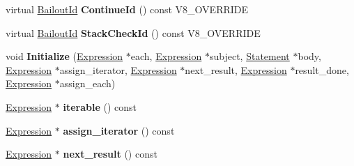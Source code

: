 \begin{DoxyCompactItemize}
\item 
\hypertarget{classv8_1_1internal_1_1_v8___f_i_n_a_l_a90b5e273e8b8f7894751af55a67b2be4}{}virtual \hyperlink{classv8_1_1internal_1_1_bailout_id}{Bailout\+Id} {\bfseries Continue\+Id} () const V8\+\_\+\+O\+V\+E\+R\+R\+I\+D\+E\label{classv8_1_1internal_1_1_v8___f_i_n_a_l_a90b5e273e8b8f7894751af55a67b2be4}

\item 
\hypertarget{classv8_1_1internal_1_1_v8___f_i_n_a_l_a990170f24ee26a29557d05605ccb92d8}{}virtual \hyperlink{classv8_1_1internal_1_1_bailout_id}{Bailout\+Id} {\bfseries Stack\+Check\+Id} () const V8\+\_\+\+O\+V\+E\+R\+R\+I\+D\+E\label{classv8_1_1internal_1_1_v8___f_i_n_a_l_a990170f24ee26a29557d05605ccb92d8}

\item 
\hypertarget{classv8_1_1internal_1_1_v8___f_i_n_a_l_a0c275e326484e10eecd260aaa7774269}{}void {\bfseries Initialize} (\hyperlink{classv8_1_1internal_1_1_expression}{Expression} $\ast$each, \hyperlink{classv8_1_1internal_1_1_expression}{Expression} $\ast$subject, \hyperlink{classv8_1_1internal_1_1_statement}{Statement} $\ast$body, \hyperlink{classv8_1_1internal_1_1_expression}{Expression} $\ast$assign\+\_\+iterator, \hyperlink{classv8_1_1internal_1_1_expression}{Expression} $\ast$next\+\_\+result, \hyperlink{classv8_1_1internal_1_1_expression}{Expression} $\ast$result\+\_\+done, \hyperlink{classv8_1_1internal_1_1_expression}{Expression} $\ast$assign\+\_\+each)\label{classv8_1_1internal_1_1_v8___f_i_n_a_l_a0c275e326484e10eecd260aaa7774269}

\item 
\hypertarget{classv8_1_1internal_1_1_v8___f_i_n_a_l_a776f5cde60063e5fbc197649b8e46e76}{}\hyperlink{classv8_1_1internal_1_1_expression}{Expression} $\ast$ {\bfseries iterable} () const \label{classv8_1_1internal_1_1_v8___f_i_n_a_l_a776f5cde60063e5fbc197649b8e46e76}

\item 
\hypertarget{classv8_1_1internal_1_1_v8___f_i_n_a_l_aa633816d895dd37630690d93ecbfd545}{}\hyperlink{classv8_1_1internal_1_1_expression}{Expression} $\ast$ {\bfseries assign\+\_\+iterator} () const \label{classv8_1_1internal_1_1_v8___f_i_n_a_l_aa633816d895dd37630690d93ecbfd545}

\item 
\hypertarget{classv8_1_1internal_1_1_v8___f_i_n_a_l_a3cb478e593eda241e9bc15029b49f6c2}{}\hyperlink{classv8_1_1internal_1_1_expression}{Expression} $\ast$ {\bfseries next\+\_\+result} () const \label{classv8_1_1internal_1_1_v8___f_i_n_a_l_a3cb478e593eda241e9bc15029b49f6c2}


\end{DoxyCompactItemize}
